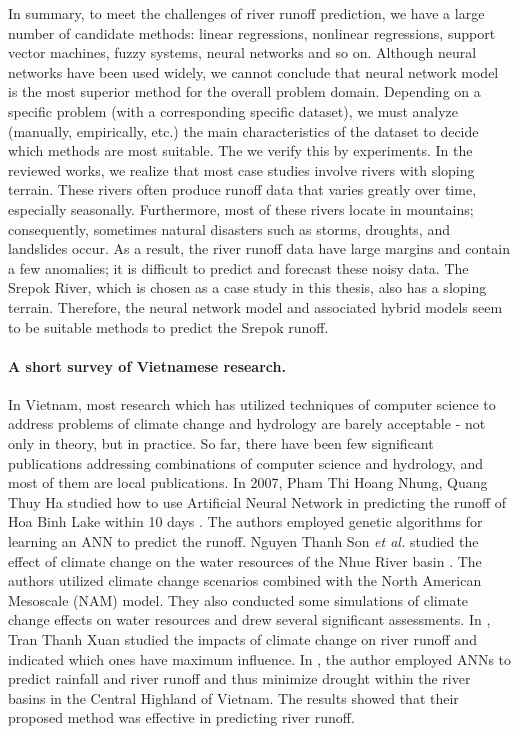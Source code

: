 In summary, to meet the challenges of river runoff prediction, we have a large number of candidate methods: linear regressions, nonlinear regressions, support vector machines, fuzzy systems, neural networks and so on. Although neural networks have been used widely, we cannot conclude that neural network model is the most superior method for the overall problem domain. Depending on a specific problem (with a corresponding specific dataset), we must analyze (manually, empirically, etc.) the main characteristics of the dataset to decide which methods are most suitable. The we verify this by experiments. In the reviewed works, we realize that most case studies involve rivers with sloping terrain. These rivers often produce runoff data that varies greatly over time, especially seasonally. Furthermore, most of these rivers locate in mountains; consequently, sometimes natural disasters such as storms, droughts, and landslides occur. As a result, the river runoff data have large margins and contain a few anomalies; it is difficult to predict and forecast these noisy data. The Srepok River, which is chosen as a case study in this thesis, also has a sloping terrain. Therefore, the neural network model and associated hybrid models seem to be suitable methods to predict the Srepok runoff.

\paragraph{A short survey of Vietnamese research.}

In Vietnam, most research which has utilized techniques of computer science to address problems of climate change and hydrology are barely acceptable - not only in theory, but in practice. So far, there have been few significant publications addressing combinations of computer science and hydrology, and most of them are local publications. In 2007, Pham Thi Hoang Nhung, Quang Thuy Ha studied how to use Artificial Neural Network in predicting the runoff of Hoa Binh Lake within 10 days \cite{ANN:ref_68}. The authors employed genetic algorithms for learning an ANN to predict the runoff. Nguyen Thanh Son \textit{et al.} studied the effect of climate change on the water resources of the Nhue River basin \cite{ANN:ref_69}. The authors utilized climate change scenarios combined with the North American Mesoscale (NAM) model. They also conducted some simulations of climate change effects on water resources and drew several significant assessments. In \cite{ANN:ref_70}, Tran Thanh Xuan studied the impacts of climate change on river runoff and indicated which ones have maximum influence. In \cite{ANN:ref_71}, the author employed ANNs to predict rainfall and river runoff and thus minimize drought within the river basins in the Central Highland of Vietnam. The results showed that their proposed method was effective in predicting river runoff.

